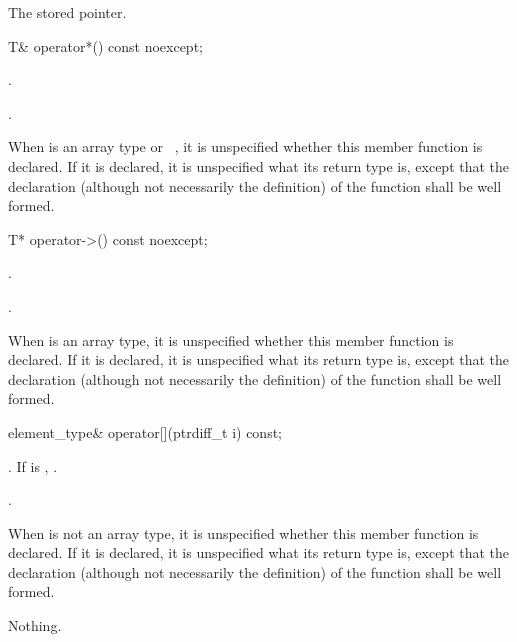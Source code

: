 \begin{itemdescr}
\pnum\returns The stored pointer.
\end{itemdescr}

%
\begin{itemdecl}
T& operator*() const noexcept;
\end{itemdecl}

\begin{itemdescr}
\pnum\requires  {}.

\pnum\returns  {}.

\pnum\remarks When  is an array type or \cv{}~,
it is unspecified whether this
member function is declared. If it is declared, it is unspecified what its
return type is, except that the declaration (although not necessarily the
definition) of the function shall be well formed.
\end{itemdescr}

%
\begin{itemdecl}
T* operator->() const noexcept;
\end{itemdecl}

\begin{itemdescr}
\pnum\requires  {}.

\pnum\returns  {}.

\pnum\remarks When  is an array type,
it is unspecified whether this member function is declared.
If it is declared, it is unspecified what its return type is,
except that the declaration (although not necessarily the definition)
of the function shall be well formed.
\end{itemdescr}

%
\begin{itemdecl}
element_type& operator[](ptrdiff_t i) const;
\end{itemdecl}

\begin{itemdescr}
\pnum\requires {}.
If  is , .

\pnum\returns {}.

\pnum\remarks When  is not an array type,
it is unspecified whether this member function is declared.
If it is declared, it is unspecified what its return type is,
except that the declaration (although not necessarily the definition)
of the function shall be well formed.

\pnum\throws Nothing.
\end{itemdescr}

